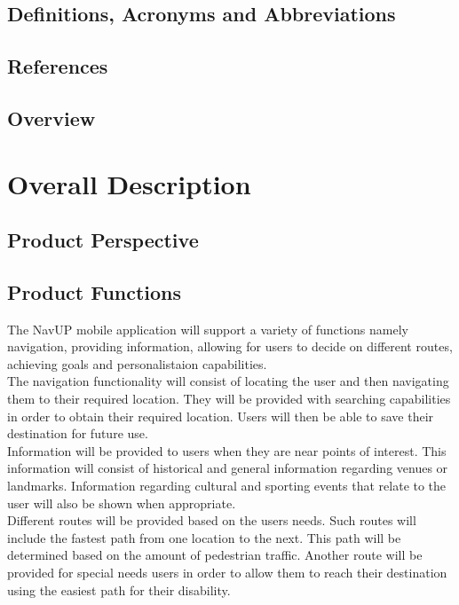 \documentclass[12pt,a4paper]{report}
\begin{document}
	\subsection*{Definitions, Acronyms and Abbreviations}
	
	\subsection*{References}
	
	
	\subsection*{Overview}
		

\newpage
\section*{Overall Description}
	\subsection*{Product Perspective}
	\subsection*{Product Functions}
	The NavUP mobile application will support a variety of functions namely navigation, providing information, allowing for users to decide on different routes, achieving goals and personalistaion capabilities.
\\

The navigation functionality will consist of locating the user and then navigating them to their required location. They will be provided with searching capabilities in order to obtain their required location. Users will then be able to save their destination for future use.
\\

Information will be provided to users when they are near points of interest. This information will consist of historical and general information regarding venues or landmarks. Information regarding cultural and sporting events that relate to the user will also be shown when appropriate.
\\

Different routes will be provided based on the users needs. Such routes will include the fastest path from one location to the next. This path will be determined based on the amount of pedestrian traffic. Another route will be provided for special needs users in order to allow them to reach their destination using the easiest path for their disability. 
\\
\end{document}
